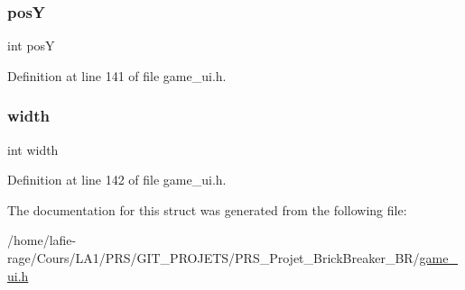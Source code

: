 \mbox{\label{structbrick__t_a65ab2de052c17234c8a1db3fd3b868a9}} 
\subsubsection{\texorpdfstring{posY}{posY}}
{\footnotesize\ttfamily int posY}



Definition at line 141 of file game\+\_\+ui.\+h.

\mbox{\label{structbrick__t_a2474a5474cbff19523a51eb1de01cda4}} 
\subsubsection{\texorpdfstring{width}{width}}
{\footnotesize\ttfamily int width}



Definition at line 142 of file game\+\_\+ui.\+h.



The documentation for this struct was generated from the following file\+:\begin{DoxyCompactItemize}
\item 
/home/lafie-\/rage/\+Cours/\+L\+A1/\+P\+R\+S/\+G\+I\+T\+\_\+\+P\+R\+O\+J\+E\+T\+S/\+P\+R\+S\+\_\+\+Projet\+\_\+\+Brick\+Breaker\+\_\+\+B\+R/\hyperlink{game__ui_8h}{game\+\_\+ui.\+h}\end{DoxyCompactItemize}
